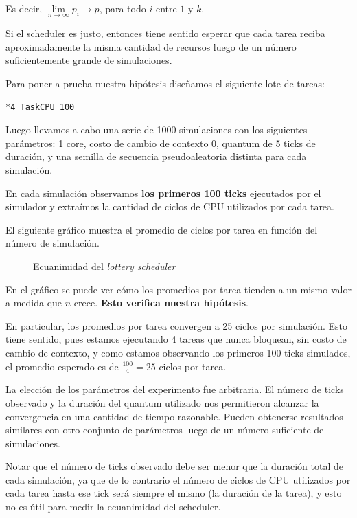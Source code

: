 \documentclass[a4paper,10pt,twoside]{article}
\begin{document}
Es decir, $\lim \limits_{n \to \infty} p_i \to p$, para todo $i$ entre $1$ y $k$.

Si el scheduler es justo, entonces tiene sentido esperar que cada tarea reciba aproximadamente la misma cantidad de recursos luego de un número suficientemente grande de simulaciones. 

Para poner a prueba nuestra hipótesis diseñamos el siguiente lote de tareas:

\begin{verbatim}
*4 TaskCPU 100
\end{verbatim}

Luego llevamos a cabo una serie de 1000 simulaciones con los siguientes parámetros: 1 core, costo de cambio de contexto 0, quantum de 5 ticks de duración, y una semilla de secuencia pseudoaleatoria distinta para cada simulación.

En cada simulación observamos \textbf{los primeros 100 ticks} ejecutados por el simulador y extraímos la cantidad de ciclos de CPU utilizados por cada tarea.

El siguiente gráfico muestra el promedio de ciclos por tarea en función del número de simulación.

\begin{figure}[H]
	\centering
	
	\caption{Ecuanimidad del \textit{lottery scheduler}}
\end{figure}

En el gráfico se puede ver cómo los promedios por tarea tienden a un mismo valor a medida que $n$ crece. \textbf{Esto verifica nuestra hipótesis}.

En particular, los promedios por tarea convergen a 25 ciclos por simulación. Esto tiene sentido, pues estamos ejecutando 4 tareas que nunca bloquean, sin costo de cambio de contexto, y como estamos observando los primeros 100 ticks simulados, el promedio esperado es de $\frac{100}{4} = 25$ ciclos por tarea.

La elección de los parámetros del experimento fue arbitraria. El número de ticks observado y la duración del quantum utilizado nos permitieron alcanzar la convergencia en una cantidad de tiempo razonable. Pueden obtenerse resultados similares con otro conjunto de parámetros luego de un número suficiente de simulaciones.

Notar que el número de ticks observado debe ser menor que la duración total de cada simulación, ya que de lo contrario el número de ciclos de CPU utilizados por cada tarea hasta ese tick será siempre el mismo (la duración de la tarea), y esto no es útil para medir la ecuanimidad del scheduler.
\end{document}
